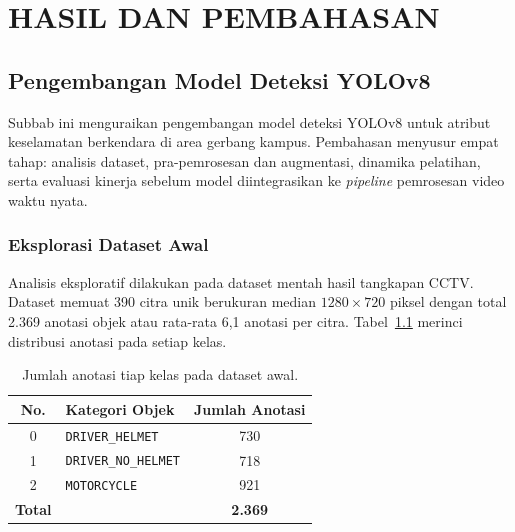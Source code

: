 
\chapter{HASIL DAN PEMBAHASAN}
\label{chap:hasil}

\section{Pengembangan Model Deteksi YOLOv8}
\label{sec:model-deteksi}
Subbab ini menguraikan pengembangan model deteksi YOLOv8 untuk atribut keselamatan berkendara di area gerbang kampus. Pembahasan menyusur empat tahap: analisis dataset, pra-pemrosesan dan augmentasi, dinamika pelatihan, serta evaluasi kinerja sebelum model diintegrasikan ke \textit{pipeline} pemrosesan video waktu nyata.

%
\subsection{Eksplorasi Dataset Awal}
\label{subsec:eda-dataset}
%

Analisis eksploratif dilakukan pada dataset mentah hasil tangkapan CCTV. Dataset memuat 390 citra unik berukuran median $1280 \times 720$ piksel dengan total 2.369 anotasi objek atau rata-rata 6,1 anotasi per citra. Tabel~\ref{tab:distribusi-objek} merinci distribusi anotasi pada setiap kelas.

\begin{table}[htbp]
  \centering
  \caption{Jumlah anotasi tiap kelas pada dataset awal.}
  \label{tab:distribusi-objek}
  \begin{tabular}{clc}
    \hline
    \textbf{No.} & \textbf{Kategori Objek} & \textbf{Jumlah Anotasi} \\
    \hline
    0 & \texttt{DRIVER\_HELMET}     & 730 \\
    1 & \texttt{DRIVER\_NO\_HELMET} & 718 \\
    2 & \texttt{MOTORCYCLE}         & 921 \\
    \hline
    \textbf{Total} & & \textbf{2.369} \\
    \hline
  \end{tabular}
\end{table}


